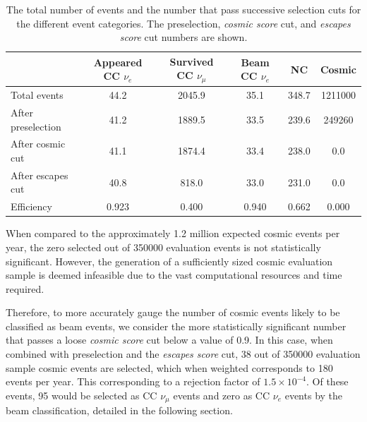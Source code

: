 \begin{table}
    \begin{tabular}{lccccc}
                           & Appeared CC $\nu_{e}$ & Survived CC $\nu_{\mu}$ & Beam CC $\nu_{e}$ & NC    & Cosmic  \\
        \midrule
        Total events       & 44.2                  & 2045.9                  & 35.1              & 348.7 & 1211000 \\
        After preselection & 41.2                  & 1889.5                  & 33.5              & 239.6 & 249260  \\
        After cosmic cut   & 41.1                  & 1874.4                  & 33.4              & 238.0 & 0.0     \\
        After escapes cut  & 40.8                  & 818.0                   & 33.0              & 231.0 & 0.0     \\
        \midrule
        Efficiency         & 0.923                 & 0.400                   & 0.940             & 0.662 & 0.000   \\
    \end{tabular}
    \caption[Number of events passing basic cuts for each event category.]
    {The total number of events and the number that pass successive selection cuts for the
        different event categories. The preselection, \emph{cosmic score} cut, and \emph{escapes
            score} cut numbers are shown.}
    \label{tab:selection}
\end{table}

When compared to the approximately 1.2 million expected cosmic events per year, the zero selected
out of 350000 evaluation events is not statistically significant. However, the generation of a
sufficiently sized cosmic evaluation sample is deemed infeasible due to the vast computational
resources and time required.

Therefore, to more accurately gauge the number of cosmic events likely to be classified as beam
events, we consider the more statistically significant number that passes a loose \emph{cosmic
    score} cut below a value of 0.9. In this case, when combined with preselection and the
\emph{escapes score} cut, 38 out of 350000 evaluation sample cosmic events are selected, which
when weighted corresponds to 180 events per year. This corresponding to a rejection factor of
$1.5\times10^{-4}$. Of these events, 95 would be selected as CC $\nu_{\mu}$ events and zero as CC
$\nu_{e}$ events by the beam classification, detailed in the following section.

